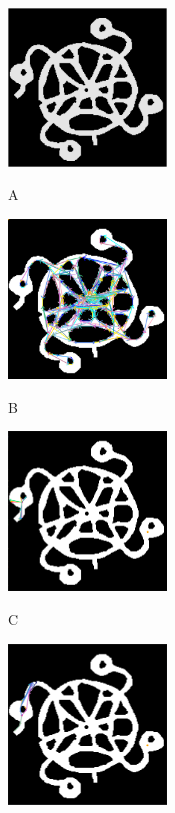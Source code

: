 \documentclass[letterpaper, 10 pt, journal, twoside]{IEEEtran}
\begin{document}
\begin{figure}[t]
\begin{minipage}{.23\linewidth}
  \centerline{\includegraphics[width=4.2cm, cframe=gray .2mm]{map.png}}
  \centerline{A}
\end{minipage}
\hfill
\begin{minipage}{.23\linewidth}
  \centerline{\includegraphics[width=4.2cm, cframe=gray .2mm]{map1.png}}
  \centerline{B}
\end{minipage}
\hfill
\begin{minipage}{.23\linewidth}
  \centerline{\includegraphics[width=4.2cm, cframe=gray .2mm]{map2.png}}
  \centerline{C}
\end{minipage}
\hfill
\begin{minipage}{.23\linewidth}
  \centerline{\includegraphics[width=4.2cm, cframe=gray .2mm]{map3.png}}

\end{minipage}
\end{figure}
\end{document}
